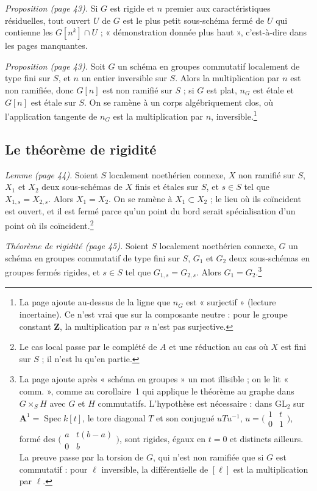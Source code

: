 \documentclass[11pt,a4paper]{article}
\begin{document}
\emph{Proposition (page 43).} Si $G$ est rigide et $n$ premier aux
caractéristiques résiduelles, tout ouvert $U$ de $G$ est le plus petit
sous-schéma fermé de $U$ qui contienne les $G[n^k] \cap U$ ; « démonstration
donnée plus haut », c'est-à-dire dans les pages manquantes.

\emph{Proposition (page 43).} Soit $G$ un schéma en groupes commutatif
localement de type fini sur $S$, et $n$ un entier inversible sur $S$. Alors la
multiplication par $n$ est non ramifiée, donc $G[n]$ est non ramifié sur $S$ ;
si $G$ est plat, $n_G$ est étale et $G[n]$ est étale sur $S$. On se ramène à
un corps algébriquement clos, où l'application tangente de $n_G$ est la
multiplication par $n$, inversible.\footnote{La page ajoute au-dessus de la
ligne que $n_G$ est « surjectif » (lecture incertaine). Ce n'est vrai que sur
la composante neutre : pour le groupe constant $\mathbf{Z}$, la multiplication
par $n$ n'est pas surjective.}

\subsection*{Le théorème de rigidité}

\emph{Lemme (page 44).} Soient $S$ localement noethérien connexe, $X$ non
ramifié sur $S$, $X_1$ et $X_2$ deux sous-schémas de $X$ finis et étales sur
$S$, et $s \in S$ tel que $X_{1,s} = X_{2,s}$. Alors $X_1 = X_2$. On se ramène
à $X_1 \subset X_2$ ; le lieu où ils coïncident est ouvert, et il est fermé
parce qu'un point du bord serait spécialisation d'un point où ils
coïncident.\footnote{Le cas local passe par le complété de $A$ et une
réduction au cas où $X$ est fini sur $S$ ; il n'est lu qu'en partie.}

\emph{Théorème de rigidité (page 45).} Soient $S$ localement noethérien
connexe, $G$ un schéma en groupes commutatif de type fini sur $S$, $G_1$ et $G_2$ deux
sous-schémas en groupes fermés rigides, et $s \in S$ tel que
$G_{1,s} = G_{2,s}$. Alors $G_1 = G_2$.\footnote{La page ajoute après « schéma en groupes » un mot illisible ; on le lit « comm. », comme au corollaire~1 qui applique le théorème au graphe dans $G \times_S H$ avec $G$ et $H$ commutatifs. L'hypothèse est nécessaire : dans $\mathrm{GL}_2$ sur $\mathbf{A}^1 = \operatorname{Spec} k[t]$, le tore diagonal $T$ et son conjugué $uTu^{-1}$, $u = \bigl(\begin{smallmatrix} 1 & t \\ 0 & 1 \end{smallmatrix}\bigr)$, formé des $\bigl(\begin{smallmatrix} a & t(b-a) \\ 0 & b \end{smallmatrix}\bigr)$, sont rigides, égaux en $t = 0$ et distincts ailleurs. La preuve passe par la torsion de $G$, qui n'est non ramifiée que si $G$ est commutatif : pour $\ell$ inversible, la différentielle de $[\ell]$ est la multiplication par $\ell$.}
\end{document}
